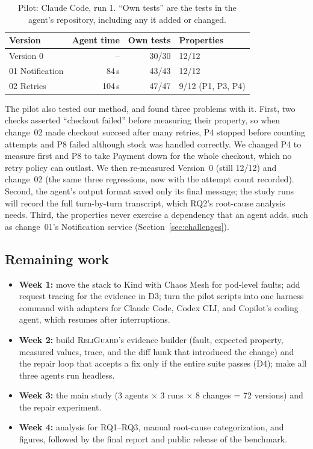\begin{table}[t]
  \caption{Pilot: Claude Code, run 1. ``Own tests'' are the tests in the agent's repository,
  including any it added or changed.}
  \label{tab:pilot}
  \small
  \begin{tabular}{@{}l r r l@{}}
    \toprule
    Version & Agent time & Own tests & Properties \\
    \midrule
    Version 0       & --     & 30/30 & 12/12 \\
    01 Notification & 84\,s  & 43/43 & 12/12 \\
    02 Retries      & 104\,s & 47/47 & 9/12 (P1, P3, P4) \\
    \bottomrule
  \end{tabular}
\end{table}

The pilot also tested our method, and found three problems with it. First, two checks asserted
``checkout failed'' before measuring their property, so when change~02 made checkout succeed after
many retries, P4 stopped before counting attempts and P8 failed although stock was handled
correctly. We changed P4 to measure first and P8 to take Payment down for the whole checkout,
which no retry policy can outlast. We then re-measured Version~0 (still 12/12) and change~02
(the same three regressions, now with the attempt count recorded). Second, the agent's output
format saved only its final message; the study runs will record the full turn-by-turn transcript,
which RQ2's root-cause analysis needs. Third, the properties never exercise a dependency that an
agent adds, such as change~01's Notification service (Section~\ref{sec:challenges}).

\subsection{Remaining work}
\label{sec:remaining}

\begin{itemize}
  \item \textbf{Week 1:} move the stack to Kind with Chaos Mesh for pod-level faults; add request
  tracing for the evidence in D3; turn the pilot scripts into one harness command with adapters
  for Claude Code, Codex CLI, and Copilot's coding agent, which resumes after interruptions.
  \item \textbf{Week 2:} build \textsc{ReliGuard}'s evidence builder (fault, expected property, measured
  values, trace, and the diff hunk that introduced the change) and the repair loop that accepts a
  fix only if the entire suite passes (D4); make all three agents run headless.
  \item \textbf{Week 3:} the main study (3 agents $\times$ 3 runs $\times$ 8 changes = 72 versions)
  and the repair experiment.
  \item \textbf{Week 4:} analysis for RQ1--RQ3, manual root-cause categorization, and figures,
  followed by the final report and public release of the benchmark.
\end{itemize}

